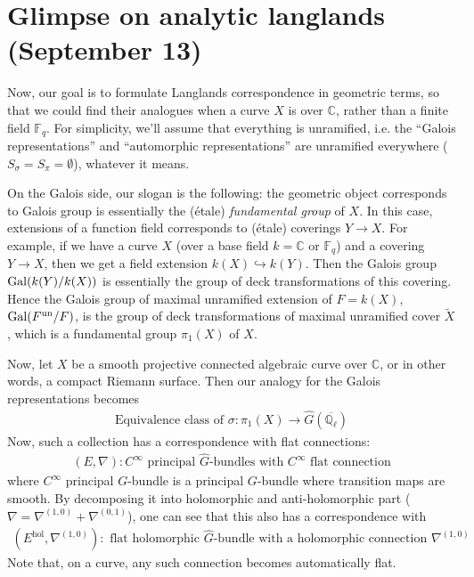 \newpage
\section{Glimpse on analytic langlands (September 13)}

Now, our goal is to formulate Langlands correspondence in geometric terms, so that we could
find their analogues when a curve $X$ is over $\mathbb{C}$, rather than a finite field $\mathbb{F}_q$.
For simplicity, we'll assume that everything is unramified, i.e. the ``Galois representations'' and ``automorphic representations''
are unramified everywhere ($S_\sigma = S_\pi = \emptyset$), whatever it means.

On the Galois side, our slogan is the following: the geometric object corresponds to 
Galois group is essentially the (\'etale) \emph{fundamental group} of $X$.
In this case, extensions of a function field corresponds to (\'etale) coverings $Y \to X$.
For example, if we have a curve $X$ (over a base field $k = \mathbb{C}$ or $\mathbb{F}_q$) and a covering $Y \to X$,
then we get a field extension $k(X) \hookrightarrow k(Y)$.
Then the Galois group $\operatorname{\mathrm{Gal}}(k(Y) / k(X))$ is essentially the group of deck transformations of this covering.
Hence the Galois group of maximal unramified extension of $F = k(X)$, $\operatorname{\mathrm{Gal}}(F^{\mathrm{un}}/F)$,
is the group of deck transformations of maximal unramified cover $\widetilde{X}$, which is a fundamental group $\pi_1(X)$ of $X$.


Now, let $X$ be a smooth projective connected algebraic curve over $\mathbb{C}$, or in other words, 
a compact Riemann surface.
Then our analogy for the Galois representations becomes
\begin{align*}
    \boxed{
        \text{Equivalence class of } \sigma: \pi_1(X) \to \widehat{G}(\overline{\mathbb{Q}_{\ell}})
    }
\end{align*}
Now, such a collection has a correspondence with flat connections:
\begin{align*}
    \boxed{
        (E, \nabla): C^{\infty} \text{ principal } \widehat{G} \text{-bundles with } C^{\infty}\text{ flat connection}
    }
\end{align*}
where $C^{\infty}$ principal $G$-bundle is a principal $G$-bundle where transition maps are smooth.
By decomposing it into holomorphic and anti-holomorphic part ($\nabla = \nabla^{(1, 0)} + \nabla^{(0, 1)}$), one can see that this also has a correspondence with
\begin{align*}
    \boxed{
        (E^{\mathrm{hol}}, \nabla^{(1, 0)}): \text{ flat holomorphic $\widehat{G}$-bundle with a holomorphic connection $\nabla^{(1, 0)}$}
    }
\end{align*}
Note that, on a curve, any such connection becomes automatically flat.

